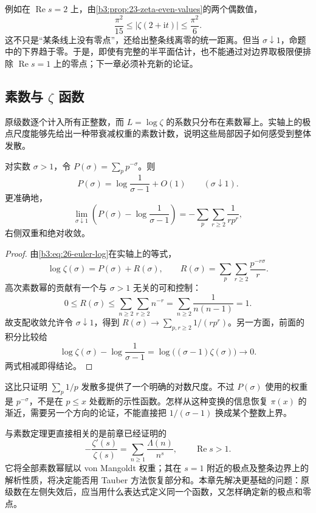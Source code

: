 例如在 \(\operatorname{Re}s=2\) 上，由\cref{b3:prop:23-zeta-even-values}的两个偶数值，
\[
 \frac{\pi^2}{15}\le|\zeta(2+\mathrm it)|\le\frac{\pi^2}{6}.
\]
这不只是“某条线上没有零点”，还给出整条线离零的统一距离。但当 \(\sigma\downarrow1\)，命题中的下界趋于零。于是，即使有完整的半平面估计，也不能通过对边界取极限便排除 \(\operatorname{Re}s=1\) 上的零点；下一章必须补充新的论证。

\subsection{素数与 \texorpdfstring{\(\zeta\)}{\AnalysisPdfZeta} 函数}
\label{b3:subsec:260103}

原级数逐个计入所有正整数，而 \(L=\log\zeta\) 的系数只分布在素数幂上。实轴上的极点尺度能够先给出一种带衰减权重的素数计数，说明这些局部因子如何感受到整体发散。

\begin{proposition}[素数倒数的参数加权和]\label{b3:prop:26-prime-weight-growth}
对实数 \(\sigma>1\)，令 \(P(\sigma)=\sum_p p^{-\sigma}\)。则
\[
 P(\sigma)=\log\frac1{\sigma-1}+O(1)\qquad(\sigma\downarrow1).
\]
更准确地，
\[
 \lim_{\sigma\downarrow1}
 \left(P(\sigma)-\log\frac1{\sigma-1}\right)
 =-\sum_p\sum_{r\ge2}\frac1{r p^r},
\]
右侧双重和绝对收敛。
\end{proposition}
\begin{proof}
由\eqref{b3:eq:26-euler-log}在实轴上的等式，
\[
 \log\zeta(\sigma)=P(\sigma)+R(\sigma),\qquad
 R(\sigma)=\sum_p\sum_{r\ge2}\frac{p^{-r\sigma}}r.
\]
高次素数幂的贡献有一个与 \(\sigma>1\) 无关的可和控制：
\[
 0\le R(\sigma)\le
 \sum_{n\ge2}\sum_{r\ge2}n^{-r}
 =\sum_{n\ge2}\frac1{n(n-1)}=1.
\]
故支配收敛允许令 \(\sigma\downarrow1\)，得到
\(R(\sigma)\to\sum_{p,r\ge2}1/(r p^r)\)。另一方面，前面的积分比较给
\[
 \log\zeta(\sigma)-\log\frac1{\sigma-1}
 =\log\bigl((\sigma-1)\zeta(\sigma)\bigr)\longrightarrow0.
\]
两式相减即得结论。
\end{proof}

这比只证明 \(\sum_p1/p\) 发散多提供了一个明确的对数尺度。不过 \(P(\sigma)\) 使用的权重是 \(p^{-\sigma}\)，不是在 \(p\le x\) 处截断的示性函数。怎样从这种变换的信息恢复 \(\pi(x)\) 的渐近，需要另一个方向的论证，不能直接把 \(1/(\sigma-1)\) 换成某个整数上界。

与素数定理更直接相关的是前章已经证明的
\[
 -\frac{\zeta'(s)}{\zeta(s)}
 =\sum_{n\ge1}\frac{\Lambda(n)}{n^s},\qquad\operatorname{Re}s>1.
\]
它将全部素数幂赋以 von Mangoldt 权重；其在 \(s=1\) 附近的极点及整条边界上的解析性质，将决定能否用 Tauber 方法恢复部分和。本章先解决更基础的问题：原级数在左侧失效后，应当用什么表达式定义同一个函数，又怎样确定新的极点和零点。
